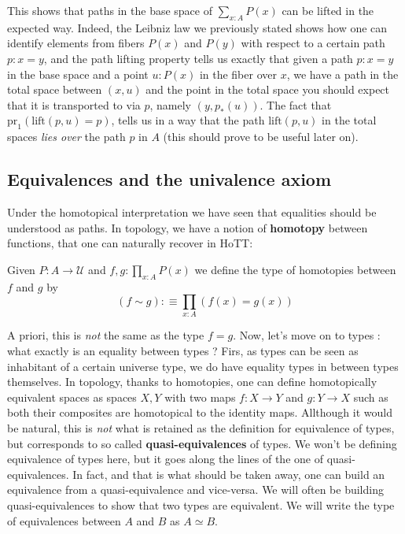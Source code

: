 \documentclass{report}
\begin{document}
This shows that paths in the base space of $\sum_{x : A} P(x)$ can be lifted in the expected way. Indeed, the Leibniz law we previously stated shows how one can identify elements from fibers $P(x)$ and $P(y)$ with respect to a certain path $p : x=y$, and the path lifting property tells us exactly that given a path $p: x = y$ in the base space and a point $u : P(x)$ in the fiber over $x$, we have a path in the total space between $(x,u)$ and the point in the total space you should expect that it is transported to via $p$, namely $(y,p_*(u))$. The fact that $\mathrm{pr}_1(\mathrm{lift}(p,u)=p)$, tells us in a way that the path $\mathrm{lift}(p,u)$ in the total spaces \textit{lies over} the path $p$ in $A$ (this should prove to be useful later on).
\subsection{Equivalences and the univalence axiom}
Under the homotopical interpretation we have seen that equalities should be understood as paths. In topology, we have a notion of \textbf{homotopy} between functions, that one can naturally recover in HoTT:
\begin{mydef}[Homotopy]
  Given $P : A \rightarrow \mathcal{U}$ and $ f,g : \prod_{x : A} P(x)$ we define the type of homotopies between $f$ and $g$ by
  $$(f \sim g) :\equiv \prod_{x : A} (f(x)=g(x))$$
\end{mydef}
A priori, this is \textit{not} the same as the type $f =g$. Now, let's move on to types : what exactly is an equality between types ? Firs, as types can be seen as inhabitant of a certain universe type, we do have equality types in between types themselves.
In topology, thanks to homotopies, one can define homotopically equivalent spaces as spaces $X,Y$ with two maps $f : X \rightarrow Y$ and $g : Y \rightarrow X$ such as both their composites are homotopical to the identity maps. Allthough it would be natural, this is \textit{not} what is retained as the definition for equivalence of types, but corresponds to so called \textbf{quasi-equivalences} of types. We won't be defining equivalence of types here, but it goes along the lines of the one of quasi-equivalences. In fact, and that is what should be taken away, one can build an equivalence from a quasi-equivalence and vice-versa. We will often be building quasi-equivalences to show that two types are equivalent. We will write the type of equivalences between $A$ and $B$ as $A \simeq B$.
\end{document}
